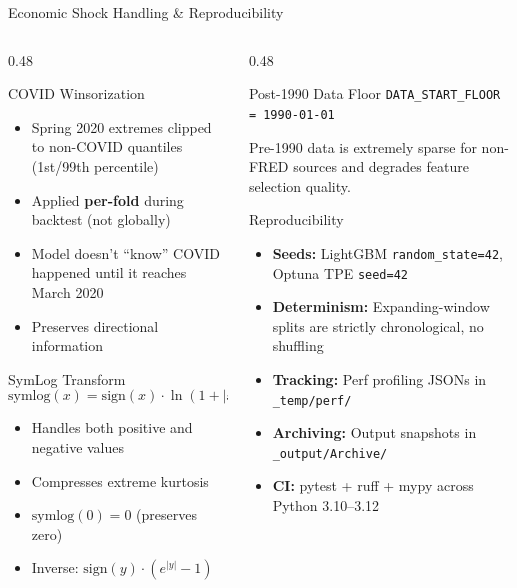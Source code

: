 \documentclass[aspectratio=169,10pt]{beamer}
\begin{document}
\begin{frame}{Economic Shock Handling \& Reproducibility}
\begin{columns}[T]
\begin{column}{0.48\textwidth}
\begin{block}{COVID Winsorization}
\footnotesize
\begin{itemize}
  \item Spring 2020 extremes clipped to non-COVID quantiles (1st/99th percentile)
  \item Applied \textbf{per-fold} during backtest (not globally)
  \item Model doesn't ``know'' COVID happened until it reaches March 2020
  \item Preserves directional information
\end{itemize}
\end{block}

\begin{block}{SymLog Transform}
\footnotesize
\[
\text{symlog}(x) = \text{sign}(x) \cdot \ln(1 + |x|)
\]
\begin{itemize}\scriptsize
  \item Handles both positive and negative values
  \item Compresses extreme kurtosis
  \item $\text{symlog}(0) = 0$ (preserves zero)
  \item Inverse: $\text{sign}(y) \cdot (e^{|y|} - 1)$
\end{itemize}
\end{block}
\end{column}
\begin{column}{0.48\textwidth}
\begin{block}{Post-1990 Data Floor}
\footnotesize
\texttt{DATA\_START\_FLOOR = 1990-01-01}

Pre-1990 data is extremely sparse for non-FRED sources and degrades feature selection quality.
\end{block}

\vspace{0.2cm}
\begin{exampleblock}{Reproducibility}
\footnotesize
\begin{itemize}
  \item \textbf{Seeds:} LightGBM \texttt{random\_state=42}, Optuna TPE \texttt{seed=42}
  \item \textbf{Determinism:} Expanding-window splits are strictly chronological, no shuffling
  \item \textbf{Tracking:} Perf profiling JSONs in \texttt{\_temp/perf/}
  \item \textbf{Archiving:} Output snapshots in \texttt{\_output/Archive/}
  \item \textbf{CI:} pytest + ruff + mypy across Python 3.10--3.12
\end{itemize}
\end{exampleblock}
\end{column}
\end{columns}
\end{frame}
\end{document}

